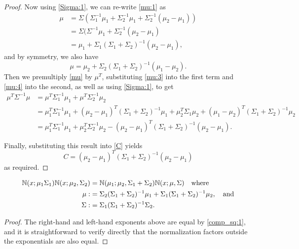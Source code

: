 \documentclass[12pt,leqno]{article}
\begin{document}
\begin{proof}
Now using \eqref{Sigma:1}, we can re-write \eqref{mu:1} as  
\begin{equation}\label{mu:3}
  \begin{split}
  \mu &= \Sigma(\Sigma_1^{-1}\mu_1 + \Sigma_2^{-1}\mu_1 +\Sigma_2^{-1}(\mu_2-\mu_1)) \\
  &= \Sigma(\Sigma^{-1}\mu_1 + \Sigma_2^{-1}(\mu_2-\mu_1) \\
  &= \mu_1 + \Sigma_1(\Sigma_1+\Sigma_2)^{-1}(\mu_2-\mu_1),
  \end{split}
  \end{equation}
and by symmetry, we also have 
\begin{equation}\label{mu:4}
  \mu = \mu_2 + \Sigma_2(\Sigma_1+\Sigma_2)^{-1}(\mu_1-\mu_2).
\end{equation}
Then we premultiply \eqref{mu} by $\mu^T$, substituting \eqref{mu:3} into the first term and
  \eqref{mu:4} into the second, as well as using \eqref{Sigma:1}, to get 
\begin{align*}
    \mu^T\Sigma^{-1}\mu &= \mu^T\Sigma_1^{-1}\mu_1 + \mu^T\Sigma_2^{-1}\mu_2 \\
    &= \mu_1^T\Sigma_1^{-1}\mu_1 + (\mu_2-\mu_1)^T(\Sigma_1+\Sigma_2)^{-1}\mu_1
    +\mu_2^T\Sigma_1\mu_2 + (\mu_1-\mu_2)^T(\Sigma_1+\Sigma_2)^{-1}\mu_2\\
    &= \mu_1^T\Sigma_1^{-1}\mu_1 + \mu_2^T\Sigma_2^{-1}\mu_2 - (\mu_2-\mu_1)^T(\Sigma_1+\Sigma_2)^{-1}(\mu_2-\mu_1).
\end{align*}

Finally, substituting this result into \eqref{C} yields
\begin{equation}\label{C:1}
  C = (\mu_2-\mu_1)^T(\Sigma_1+\Sigma_2)^{-1}(\mu_2-\mu_1)
\end{equation}
as required.
\end{proof}

\begin{Cor}\label{comp_sq:2}
\begin{align*}
  {\mathbb N}(x;\mu_1\Sigma_1){\mathbb N}(x;\mu_2,\Sigma_2) &= {\mathbb N}(\mu_1;\mu_2,\Sigma_1+\Sigma_2)
  {\mathbb N}(x;\mu,\Sigma) \quad\text{where}\\
 \mu :&= \Sigma_2(\Sigma_1+\Sigma_2)^{-1}\mu_1+\Sigma_1(\Sigma_1+\Sigma_2)^{-1}\mu_2, \quad\text{and}\\
 \Sigma :&= \Sigma_1(\Sigma_1 + \Sigma_2)^{-1}\Sigma_2.
\end{align*}
\begin{proof}
  The right-hand and left-hand exponents above are equal by \eqref{comp_sq:1}, and it is
  straightforward to verify directly that the normalization factors outside the exponentials are also equal. 
\end{proof}
\end{Cor}
\end{document}
